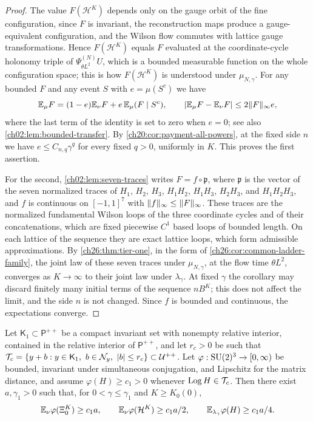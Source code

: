 \begin{proof}
The value $F(\mathcal H^K)$ depends only on the gauge orbit of the fine configuration, since $F$ is invariant, the reconstruction maps produce a gauge-equivalent configuration, and the Wilson flow commutes with lattice gauge transformations. Hence $F(\mathcal H^K)$ equals $F$ evaluated at the coordinate-cycle holonomy triple of $\Psi^{(N)}_{\theta L^2}U$, which is a bounded measurable function on the whole configuration space; this is how $F(\mathcal H^K)$ is understood under $\mu_{N,\gamma}$. For any bounded $F$ and any event $S$ with $e=\mu(S^c)$ we have
\begin{equation}\label{ch31:eq:bounded-selection-transfer}
 \mathbb E_\mu F=(1-e)\mathbb E_\nu F+e\,\mathbb E_\mu(F\mid S^c),\qquad\lvert \mathbb E_\mu F-\mathbb E_\nu F\rvert\le2\lVert F\rVert_\infty e,
\end{equation}
where the last term of the identity is set to zero when $e=0$; see also \cref{ch02:lem:bounded-transfer}. By \cref{ch20:cor:payment-all-powers}, at the fixed side $n$ we have $e\le C_{n,q}\gamma^q$ for every fixed $q>0$, uniformly in $K$. This proves the first assertion.

For the second, \cref{ch02:lem:seven-traces} writes $F=f\circ\mathfrak p$, where $\mathfrak p$ is the vector of the seven normalized traces of $H_1$, $H_2$, $H_3$, $H_1H_2$, $H_1H_3$, $H_2H_3$, and $H_1H_2H_3$, and $f$ is continuous on $[-1,1]^7$ with $\lVert f\rVert_\infty\le\lVert F\rVert_\infty$. These traces are the normalized fundamental Wilson loops of the three coordinate cycles and of their concatenations, which are fixed piecewise $C^1$ based loops of bounded length. On each lattice of the sequence they are exact lattice loops, which form admissible approximations. By \cref{ch26:thm:tier-one}, in the form of \cref{ch26:cor:common-ladder-family}, the joint law of these seven traces under $\mu_{N,\gamma}$, at the flow time $\theta L^2$, converges as $K\to\infty$ to their joint law under $\lambda_\gamma$. At fixed $\gamma$ the corollary may discard finitely many initial terms of the sequence $nB^K$; this does not affect the limit, and the side $n$ is not changed. Since $f$ is bounded and continuous, the expectations converge.
\end{proof}

\begin{lemma}\label{ch31:lem:positive-mass}
Let $\mathsf K_1\subset\mathsf P^{++}$ be a compact invariant set with nonempty relative interior, contained in the relative interior of $\mathsf P^{++}$, and let $r_c>0$ be such that $\mathcal T_c=\{y+b:y\in\mathsf K_1,\ b\in\mathcal N_{y},\ \lvert b\rvert\le r_c\}\subset\mathcal U^{++}$. Let $\varphi:\mathrm{SU}(2)^3\to[0,\infty)$ be bounded, invariant under simultaneous conjugation, and Lipschitz for the matrix distance, and assume $\varphi(H)\ge c_1>0$ whenever $\operatorname{Log} H\in\mathcal T_c$. Then there exist $a,\gamma_1>0$ such that, for $0<\gamma\le\gamma_1$ and $K\ge K_0(0)$,
\[
 \mathbb E_\nu\varphi(\Xi_0^K)\ge c_1a,\qquad\mathbb E_\nu\varphi(\mathcal H^K)\ge c_1a/2,\qquad\mathbb E_{\lambda_\gamma}\varphi(H)\ge c_1a/4.
\]
\end{lemma}

